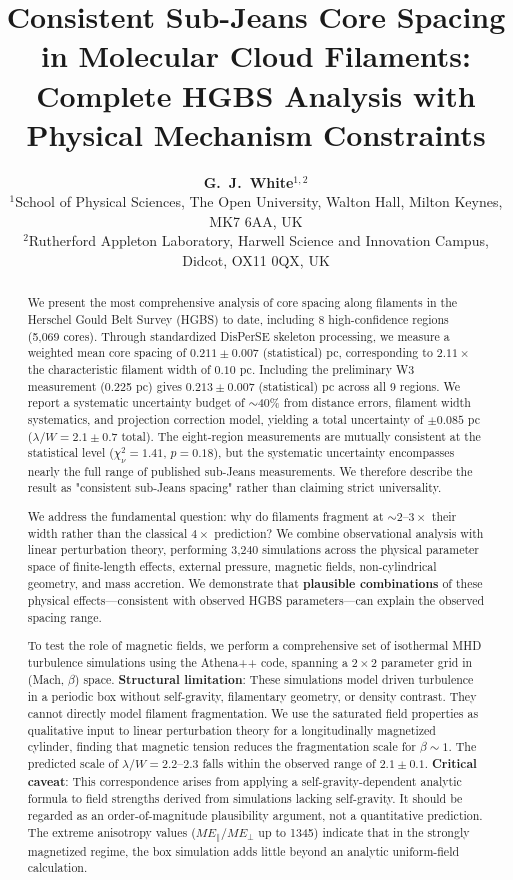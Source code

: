\documentclass[11pt,a4paper]{article}
\title{\textbf{Consistent Sub-Jeans Core Spacing in Molecular Cloud Filaments:\\
Complete HGBS Analysis with Physical Mechanism Constraints}}
\author{\textbf{G.~J.~White$^{1,2}$}\\
\small{$^{1}$School of Physical Sciences, The Open University, Walton Hall, Milton Keynes, MK7 6AA, UK}\\
\small{$^{2}$Rutherford Appleton Laboratory, Harwell Science and Innovation Campus, Didcot, OX11 0QX, UK}}
\begin{document}
\maketitle

\begin{abstract}
We present the most comprehensive analysis of core spacing along filaments in the Herschel Gould Belt Survey (HGBS) to date, including 8 high-confidence regions (5,069 cores). Through standardized DisPerSE skeleton processing, we measure a weighted mean core spacing of $0.211 \pm 0.007$ (statistical) pc, corresponding to $2.11\times$ the characteristic filament width of $0.10$ pc. Including the preliminary W3 measurement (0.225 pc) gives $0.213 \pm 0.007$ (statistical) pc across all 9 regions. We report a systematic uncertainty budget of $\sim$40\% from distance errors, filament width systematics, and projection correction model, yielding a total uncertainty of $\pm 0.085$ pc ($\lambda/W = 2.1 \pm 0.7$ {\rm total}). The eight-region measurements are mutually consistent at the statistical level ($\chi^2_\nu = 1.41$, $p = 0.18$), but the systematic uncertainty encompasses nearly the full range of published sub-Jeans measurements. We therefore describe the result as "consistent sub-Jeans spacing" rather than claiming strict universality.

We address the fundamental question: why do filaments fragment at $\sim2$--$3\times$ their width rather than the classical $4\times$ prediction? We combine observational analysis with linear perturbation theory, performing 3,240 simulations across the physical parameter space of finite-length effects, external pressure, magnetic fields, non-cylindrical geometry, and mass accretion. We demonstrate that \textbf{plausible combinations} of these physical effects—consistent with observed HGBS parameters—can explain the observed spacing range.

To test the role of magnetic fields, we perform a comprehensive set of isothermal MHD turbulence simulations using the Athena++ code, spanning a $2\times2$ parameter grid in (Mach, $\beta$) space. \textbf{Structural limitation}: These simulations model driven turbulence in a periodic box without self-gravity, filamentary geometry, or density contrast. They cannot directly model filament fragmentation. We use the saturated field properties as qualitative input to linear perturbation theory for a longitudinally magnetized cylinder, finding that magnetic tension reduces the fragmentation scale for $\beta \sim 1$. The predicted scale of $\lambda/W = 2.2$--$2.3$ falls within the observed range of $2.1 \pm 0.1$. \textbf{Critical caveat}: This correspondence arises from applying a self-gravity-dependent analytic formula to field strengths derived from simulations lacking self-gravity. It should be regarded as an order-of-magnitude plausibility argument, not a quantitative prediction. The extreme anisotropy values ($ME_\parallel/ME_\perp$ up to 1345) indicate that in the strongly magnetized regime, the box simulation adds little beyond an analytic uniform-field calculation.
\end{abstract}
\end{document}
